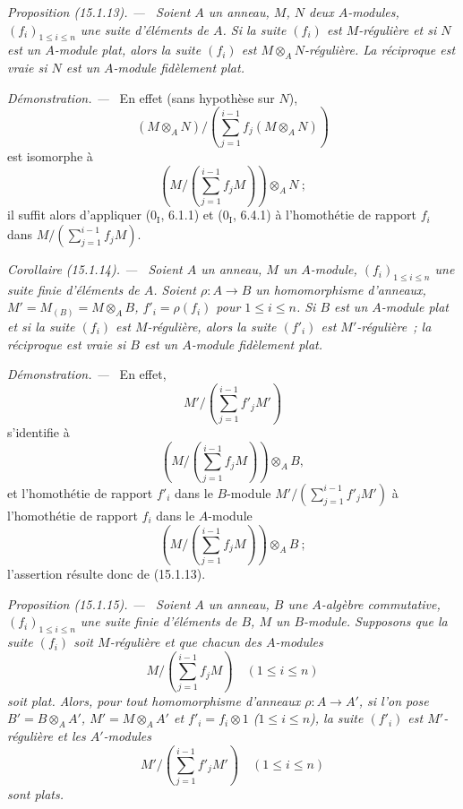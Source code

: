 \documentclass[10pt,oneside]{book}
\makeatletter
\newcommand{\setmanualcurrentlabel}[1]{\def\@currentlabel{#1}}
\newenvironment{proposition}[1][]{%
  \setmanualcurrentlabel{#1}\par\medskip\noindent\itshape Proposition (#1). ---\ }{\par}
\newenvironment{corollary}[1][]{%
  \setmanualcurrentlabel{#1}\par\medskip\noindent\itshape Corollaire (#1). ---\ }{\par}
\newenvironment{proof}{%
  \par\medskip\noindent\textit{Démonstration. ---\ }}{\par}
\makeatother
\begin{document}
\begin{proposition}[15.1.13]
\label{0.15.1.13-fr}
Soient $A$ un anneau, $M$, $N$ deux $A$-modules, $(f_i)_{1\leq i\leq n}$ une
suite d'éléments de $A$. Si la suite $(f_i)$ est $M$-régulière et si $N$ est
un $A$-module plat, alors la suite $(f_i)$ est
$M\otimes_A N$-régulière. La réciproque est vraie si $N$ est un $A$-module
fidèlement plat.
\end{proposition}

\begin{proof}
En effet (sans hypothèse sur $N$),
\[
  (M\otimes_A N)/
  \left(\sum_{j=1}^{i-1}f_j(M\otimes_A N)\right)
\]
est isomorphe à
\[
  \left(M/\left(\sum_{j=1}^{i-1}f_jM\right)\right)\otimes_A N~;
\]
il suffit alors d'appliquer ($0_{\mathrm I}$, 6.1.1) et
($0_{\mathrm I}$, 6.4.1) à l'homothétie de rapport $f_i$ dans
$M/(\sum_{j=1}^{i-1}f_jM)$.
\end{proof}

\begin{corollary}[15.1.14]
\label{0.15.1.14-fr}
Soient $A$ un anneau, $M$ un $A$-module, $(f_i)_{1\leq i\leq n}$ une suite
finie d'éléments de $A$. Soient $\rho:A\to B$ un homomorphisme d'anneaux,
$M'=M_{(B)}=M\otimes_A B$, $f'_i=\rho(f_i)$ pour $1\leq i\leq n$. Si $B$ est
un $A$-module plat et si la suite $(f_i)$ est $M$-régulière, alors la suite
$(f'_i)$ est $M'$-régulière~; la réciproque est vraie si $B$ est un
$A$-module fidèlement plat.
\end{corollary}

\begin{proof}
En effet,
\[
  M'/\left(\sum_{j=1}^{i-1}f'_jM'\right)
\]
s'identifie à
\[
  \left(M/\left(\sum_{j=1}^{i-1}f_jM\right)\right)\otimes_A B,
\]
et l'homothétie de rapport $f'_i$ dans le $B$-module
$M'/(\sum_{j=1}^{i-1}f'_jM')$ à l'homothétie de rapport $f_i$ dans le
$A$-module
\[
  \left(M/\left(\sum_{j=1}^{i-1}f_jM\right)\right)\otimes_A B~;
\]
l'assertion résulte donc de (15.1.13).
\end{proof}

\begin{proposition}[15.1.15]
\label{0.15.1.15-fr}
Soient $A$ un anneau, $B$ une $A$-algèbre commutative,
$(f_i)_{1\leq i\leq n}$ une suite finie d'éléments de $B$, $M$ un
$B$-module. Supposons que la suite $(f_i)$ soit $M$-régulière et que chacun
des $A$-modules
\[
  M/\left(\sum_{j=1}^{i-1}f_jM\right)\quad(1\leq i\leq n)
\]
soit plat. Alors, pour tout homomorphisme d'anneaux $\rho:A\to A'$, si l'on
pose $B'=B\otimes_A A'$, $M'=M\otimes_A A'$ et $f'_i=f_i\otimes1$
($1\leq i\leq n$), la suite $(f'_i)$ est $M'$-régulière et les
$A'$-modules
\[
  M'/\left(\sum_{j=1}^{i-1}f'_jM'\right)\quad(1\leq i\leq n)
\]
sont plats.
\end{proposition}
\end{document}
